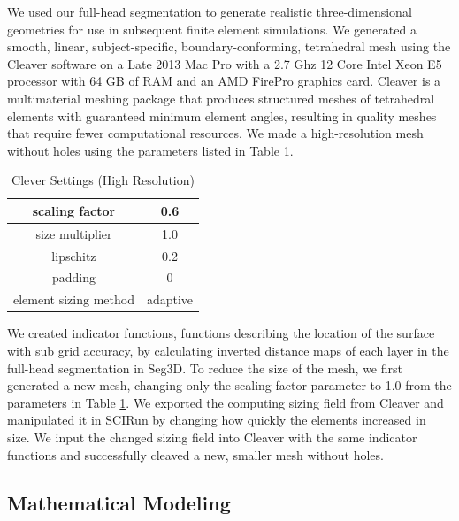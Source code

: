 We used our full-head segmentation to generate realistic three-dimensional geometries for use in subsequent finite element simulations. We generated a smooth, linear, subject-specific, boundary-conforming, tetrahedral mesh using the Cleaver software \cite{ref:cleaver} on a Late 2013 Mac Pro with a 2.7 Ghz 12 Core Intel Xeon E5 processor with 64 GB of RAM and an AMD FirePro graphics card. Cleaver is a multimaterial meshing package that produces structured meshes of tetrahedral elements with guaranteed minimum element angles, resulting in quality meshes that require fewer computational resources. We made a high-resolution mesh without holes using the parameters listed in Table \ref{tab:cleaver}.
\begin{table}[H]
\centering
\caption{Clever Settings (High Resolution)}
\label{tab:cleaver}
\begin{tabular}{|c|c|}
\hline
scaling factor                    & 0.6                 \\ \hline
size multiplier                   & 1.0                 \\ \hline
lipschitz                         & 0.2                 \\ \hline
padding                           & 0                   \\ \hline
element sizing method             & adaptive            \\ \hline
\end{tabular}
\end{table}

We created indicator functions, functions describing the location of the surface with sub grid accuracy, by calculating inverted distance maps of each layer in the full-head segmentation in Seg3D. To reduce the size of the mesh, we first generated a new mesh, changing only the scaling factor parameter to 1.0 from the parameters in Table \ref{tab:cleaver}. We exported the computing sizing field from Cleaver and manipulated it in SCIRun by changing how quickly the elements increased in size. We input the changed sizing field into Cleaver with the same indicator functions and successfully cleaved a new, smaller mesh without holes.

\subsection{Mathematical Modeling}
\label{sec:math}



